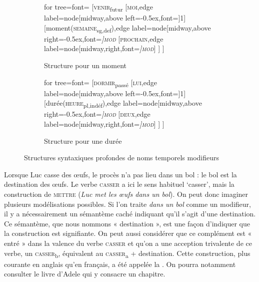 {\begin{figure}[H]
	\begin{subfigure}[b]{0.5\textwidth}
		\centering
		\begin{forest} for tree={font=\normalfont}
			[\textsc{venir}\textsubscript{futur}
			[\textsc{moi},edge label={node[midway,above left=-0.5ex,font=\footnotesize]{1}}]
			[moment(\textsc{semaine}\textsubscript{sg,def}),edge label={node[midway,above right=-0.5ex,font=\footnotesize\itshape]{\textsc{mod}}}
			[\textsc{prochain},edge label={node[midway,right,font=\footnotesize\itshape]{\textsc{mod}}}]
			]
			]
		\end{forest}
		\caption{Structure pour un moment}
	\end{subfigure}%
	\hfill
	\begin{subfigure}[b]{0.5\textwidth}
		\centering
		\begin{forest} for tree={font=\normalfont}
			[\textsc{dormir}\textsubscript{passé}
			[\textsc{lui},edge label={node[midway,above left=-0.5ex,font=\footnotesize]{1}}]
			[durée(\textsc{heure}\textsubscript{pl,indéf}),edge label={node[midway,above right=-0.5ex,font=\footnotesize\itshape]{\textsc{mod}}}
			[\textsc{deux},edge label={node[midway,right,font=\footnotesize\itshape]{\textsc{mod}}}]
			]
			]
		\end{forest}
		\caption{Structure pour une durée}
	\end{subfigure}
\caption{Structures syntaxiques profondes de noms temporels modifieurs}
\end{figure}

 Lorsque Luc casse des œufs, le procès n’a pas lieu dans un bol : le bol est la destination des œufs. Le verbe \textsc{casser} a ici le sens habituel ‘casser’, mais la construction de \textsc{mettre} (\textit{Luc met les œufs dans un bol}). On peut donc imaginer plusieurs modélisations possibles. Si l’on traite \textit{dans un bol} comme un modifieur, il y a nécessairement un sémantème caché indiquant qu’il s’agit d’une destination. Ce sémantème, que nous nommons « destination », est une façon d’indiquer que la construction est signifiante. On peut aussi considérer que ce complément est « entré » dans la valence du verbe \textsc{casser} et qu’on a une acception trivalente de ce verbe, un \textsc{casser}\textsubscript{b}, équivalent au \textsc{casser}\textsubscript{a} + destination. Cette construction, plus courante en anglais qu'en français, a été appelée la . On pourra notamment consulter le livre d'Adele \citet{goldberg1995constructions} qui y consacre un chapitre.

}
